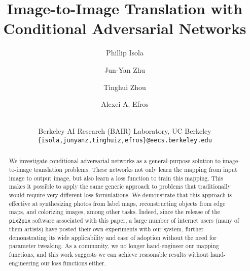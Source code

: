 \documentclass[10pt,twocolumn,letterpaper]{article}
\begin{document}
\newcommand{\norm}[1]{\lVert#1\rVert}




\title{Image-to-Image Translation with Conditional Adversarial Networks}

\vspace{-1mm}
\author{Phillip Isola
\and
Jun-Yan Zhu
\and
Tinghui Zhou
\and
Alexei A. Efros
\and
\vspace{-1mm}
\\
Berkeley AI Research (BAIR) Laboratory, UC Berkeley\\
{\tt\small \{isola,junyanz,tinghuiz,efros\}@eecs.berkeley.edu}
}




\vspace{-1mm}
\begin{abstract}
\vspace{-1mm}
We investigate conditional adversarial networks as a general-purpose solution to image-to-image translation problems. These networks not only learn the mapping from input image to output image, but also learn a loss function to train this mapping. This makes it possible to apply the same generic approach to problems that traditionally would require very different loss formulations. We demonstrate that this approach is effective at synthesizing photos from label maps, reconstructing objects from edge maps, and colorizing images, among other tasks. Indeed, since the release of the {\tt pix2pix} software associated with this paper, a large number of internet users (many of them artists) have posted their own experiments with our system, further demonstrating its wide applicability and ease of adoption without the need for parameter tweaking.
As a community, we no longer hand-engineer our mapping functions, and this work suggests we can achieve reasonable results without hand-engineering our loss functions either.

\end{abstract}
\end{document}
